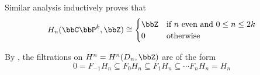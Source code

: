 \begin{example}
    Similar analysis inductively proves that 
    \begin{align*}
        H_n(\bbC\bbP^k, \bbZ) \cong \begin{cases} \bbZ &\text{if } n \text{ even and } 0 \leq n \leq 2k \\ 0 &\text{otherwise } \end{cases}
    \end{align*}

    By , the filtrations on $H^n = H^n(D_n, \bbZ)$ are of the form 
    $$0 = F_{-1} H_n \subseteq F_0 H_n \subseteq F_1 H_n \subseteq \cdots F_n H_n = H_n$$

\end{example}


